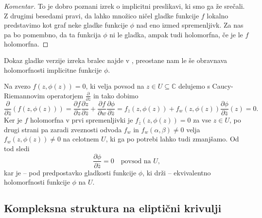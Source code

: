 \documentclass[mat1]{fmfdelo}
\numberwithin{equation}{section}
\newcommand{\C}{\mathbb C}
\newcommand{\pdv}[2][]{\frac{\partial#1}{\partial#2}}
\theoremstyle{definition}
\newenvironment{komentar}[1][Komentar]{\begin{proof}[#1]\let\qed\relax}{\end{proof}}
\begin{document}
\begin{komentar}
    To je dobro poznani izrek o implicitni preslikavi, ki smo ga že srečali. Z drugimi besedami pravi, da lahko množico ničel gladke funkcije $f$ lokalno predstavimo kot graf neke gladke funkcije $\phi$ nad eno izmed spremenljivk. Za nas pa bo pomembno, da ta funkcija $\phi$ ni le gladka, ampak tudi holomorfna, če je le $f$ holomorfna. 
\end{komentar}

\begin{dokaz}
    Dokaz gladke verzije izreka bralec najde v \cite[Izrek 14]{Globevnik}, preostane nam le še obravnava holomorfnosti implicitne funkcije $\phi$.

    Na zvezo $f(z, \phi(z)) = 0$, ki velja povsod na $z \in U \subseteq \C$ delujemo s Caucy-Riemannovim operatorjem $\pdv{\bar{z}}$ in tako dobimo
    \[
        \pdv{\bar{z}} \left( f(z, \phi(z)) \right) = \pdv[f]{z} \pdv[z]{\bar{z}} + \pdv[f]{w} \pdv[\phi]{\bar{z}}
        =
        f_{\bar{z}}(z, \phi(z)) + f_{w}(z, \phi(z)) \pdv[\phi]{\bar{z}}(z) = 0.  
    \] 
    Ker je $f$ holomorfna v prvi spremenljivki je $f_{\bar{z}}(z, \phi(z)) = 0$ za vse $z \in U$, po drugi strani pa zaradi zveznosti odvoda $f_w$ in $f_w(\alpha, \beta) \neq 0$ velja $f_{w}(z, \phi(z)) \neq 0$ na celotnem $U$, ki ga po potrebi lahko tudi zmanjšamo. Od tod sledi
    \[
        \pdv[\phi]{\bar{z}} = 0 \quad \text {povsod na $U$,}  
    \]
    kar je -- pod predpostavko gladkosti funkcije $\phi$, ki drži -- ekvivalentno holomorfnosti funkcije $\phi$ na $U$. 
\end{dokaz}



\newpage

\subsection{Kompleksna struktura na eliptični krivulji}
\label{Kompleksna struktura na elipticni krivulji}
\end{document}
